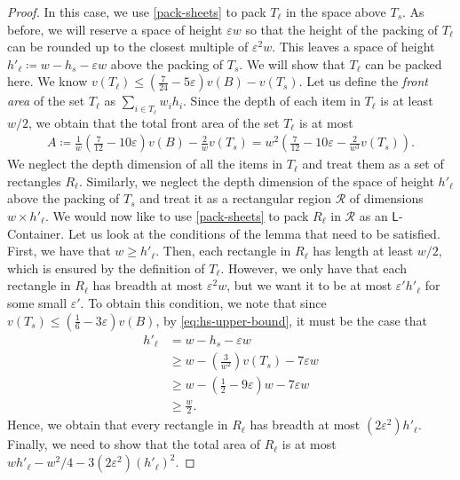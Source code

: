 \documentclass[10pt,a4paper]{amsart}
\newcommand{\mt}[1]{#1}
\newcommand{\eps}{\varepsilon}
\theoremstyle{definition}
\newcommand{\LContainer}{$\mathsf{L}$-Container}
\begin{document}
\begin{proof}
In this case, we use \cref{pack-sheets} to pack $T_\ell$ in the space above $T_s$.
As before, we will reserve a space of height $\eps w$ so that the height of the packing of $T_{\ell}$
can be rounded up to the closest multiple of $\eps^2 w$. This leaves a space of height 
$h'_{\ell}\coloneqq w-h_s-\eps w$ above the packing of $T_s$. We will show that $T_{\ell}$ can be packed here.
We know $v(T_\ell)\le \left(\frac{7}{24}-5\eps\right)v(B)-v(T_s)$.
Let us define the \emph{front area} of the set $T_\ell$ as $\sum_{i\in T_\ell}w_ih_i$.
Since the depth of each item in $T_\ell$ is at least $w/2$, we obtain that the total front area of the set $T_\ell$
is at most 
\begin{align*}
    A\coloneqq \frac{1}{w}\left(\frac{7}{12}-10\eps\right)v(B)-\frac{2}{w}v(T_s)=w^2\left(\frac{7}{12}-10\eps-\frac{2}{w^3}v(T_s)\right).
\end{align*}
We neglect the depth dimension of all the items in $T_\ell$ and treat them as a set of rectangles $R_\ell$. Similarly,
we neglect the depth dimension of the space of height $h'_{\ell}$ above the packing of $T_s$ and treat it as a rectangular region $\mathcal R$
of dimensions $w\times h'_{\ell}$.
We would now like to use \cref{pack-sheets} to pack $R_{\ell}$ in $\mathcal R$ as an \LContainer.
Let us look at the conditions of the lemma that need to be satisfied.
First, we have that $w\ge h'_{\ell}$. Then, each rectangle in $R_\ell$ has length at least $w/2$, which is ensured by the definition of $T_{\ell}$.
However, we only have that each rectangle in $R_{\ell}$ has breadth at most $\eps^2 w$, but we want it \mt{to }be at most $\eps' h'_{\ell}$ for some small $\eps'$.
To obtain this condition, we note that since $v(T_s)\le (\frac16-3\eps)v(B)$, by \cref{eq:hs-upper-bound}, it must be the case that
\begin{align}
    h'_{\ell}&=w-h_s-\eps w\nonumber\\    
        &\ge w-\left(\frac{3}{w^2}\right)v(T_s)-7\eps w\label{eq:hl-lower-bound}\\
        &\ge w-\left(\frac12-9\eps\right)w-7\eps w\nonumber\\
        &\ge \frac{w}{2}.\nonumber
\end{align}
Hence, we obtain that every rectangle in $R_{\ell}$ has breadth at most $(2\eps^2)h'_{\ell}$.
Finally, we need to show that the total area of $R_{\ell}$ is at most $wh'_{\ell}-w^2/4-3(2\eps^2)(h'_{\ell})^2$.

\end{proof}
\end{document}
